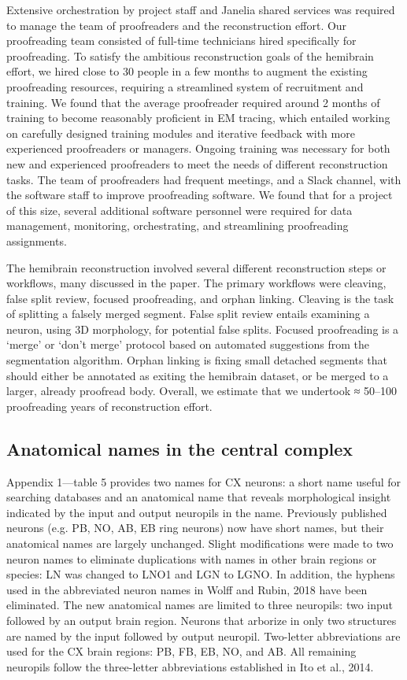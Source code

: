 \documentclass{article}
\begin{document}
Extensive orchestration by project staff and Janelia shared services was required to manage the team of proofreaders and the reconstruction effort. Our proofreading team consisted of full-time technicians hired specifically for proofreading. To satisfy the ambitious reconstruction goals of the hemibrain effort, we hired close to 30 people in a few months to augment the existing proofreading resources, requiring a streamlined system of recruitment and training. We found that the average proofreader required around 2 months of training to become reasonably proficient in EM tracing, which entailed working on carefully designed training modules and iterative feedback with more experienced proofreaders or managers. Ongoing training was necessary for both new and experienced proofreaders to meet the needs of different reconstruction tasks. The team of proofreaders had frequent meetings, and a Slack channel, with the software staff to improve proofreading software. We found that for a project of this size, several additional software personnel were required for data management, monitoring, orchestrating, and streamlining proofreading assignments.

The hemibrain reconstruction involved several different reconstruction steps or workflows, many discussed in the paper. The primary workflows were cleaving, false split review, focused proofreading, and orphan linking. Cleaving is the task of splitting a falsely merged segment. False split review entails examining a neuron, using 3D morphology, for potential false splits. Focused proofreading is a ‘merge’ or ‘don’t merge’ protocol based on automated suggestions from the segmentation algorithm. Orphan linking is fixing small detached segments that should either be annotated as exiting the hemibrain dataset, or be merged to a larger, already proofread body. Overall, we estimate that we undertook ≈ 50–100 proofreading years of reconstruction effort.

\subsection*{Anatomical names in the central complex}

Appendix 1—table 5 provides two names for CX neurons: a short name useful for searching databases and an anatomical name that reveals morphological insight indicated by the input and output neuropils in the name. Previously published neurons (e.g. PB, NO, AB, EB ring neurons) now have short names, but their anatomical names are largely unchanged. Slight modifications were made to two neuron names to eliminate duplications with names in other brain regions or species: LN was changed to LNO1 and LGN to LGNO. In addition, the hyphens used in the abbreviated neuron names in Wolff and Rubin, 2018 have been eliminated. The new anatomical names are limited to three neuropils: two input followed by an output brain region. Neurons that arborize in only two structures are named by the input followed by output neuropil. Two-letter abbreviations are used for the CX brain regions: PB, FB, EB, NO, and AB. All remaining neuropils follow the three-letter abbreviations established in Ito et al., 2014.
\end{document}
